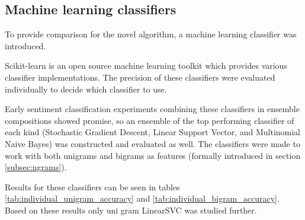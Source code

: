 \documentclass[a4paper,11pt]{kth-mag}
\begin{document}
\clearpage
\subsection{Machine learning classifiers}
To provide comparison for the novel algorithm, a machine learning classifier was introduced.

Scikit-learn\cite{scikit-learn} is an open source machine learning toolkit which provides various
classifier implementations.
The precision of these classifiers were evaluated individually to decide which classifier to use.

Early sentiment classification experiments combining these classifiers in ensemble compositions
showed promise, so an ensemble of the top performing
classifier of each kind (Stochastic Gradient Descent, Linear Support Vector, and Multinomial Naive Bayes)
was constructed and evaluated as well. The classifiers were made to work with both unigrams and bigrams
as features (formally introduced in section \ref{subsec:ngrams}).

Results for these classifiers can be seen in tables
\ref{tab:individual_unigram_accuracy} and \ref{tab:individual_bigram_accuracy}.
Based on these results only uni gram LinearSVC was studied further.
\end{document}
